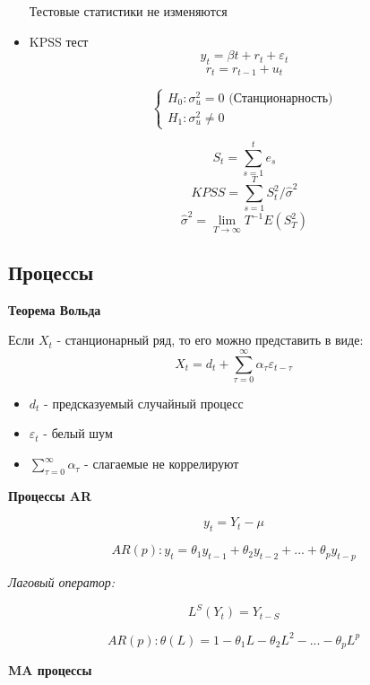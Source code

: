 \documentclass[a4paper, 12pt]{article}
\begin{document}
\begin{itemize}
    Тестовые статистики не изменяются
    
    \item KPSS тест
    \[y_{t} = \beta t + r_{t} + \varepsilon_{t}\]
    \[r_{t} = r_{t-1} + u_{t}\]
    
    \[\begin{cases}
        H_{0}: \sigma_{u}^{2} = 0 \textrm{ (Станционарность)} \\
        H_{1}: \sigma_{u}^{2} \neq 0
    \end{cases}\]
    
    \[S_{t} = \sum_{s = 1}^{t}e_{s}\]
    \[KPSS = \sum_{s = 1}^{T}S_{t}^{2} / \hat{\sigma}^{2}\]
    \[\hat{\sigma}^{2} =\lim_{T \to \infty} T^{-1}E(S^{2}_{T})\]
\end{itemize}

\subsection{Процессы}

\begin{center}
    \textbf{Теорема Вольда}
\end{center}

Если $X_{t}$ - станционарный ряд, то его можно представить в виде: \[X_{t} = d_{t} + \sum_{\tau = 0}^{\infty}\alpha_{\tau}\varepsilon_{t - \tau}\]

\begin{itemize}
    \item $d_{t}$ - предсказуемый случайный процесс
    \item $\varepsilon_{t}$ - белый шум
    \item $\sum_{\tau = 0}^{\infty}\alpha_{\tau}$ - слагаемые не коррелируют
\end{itemize}

\begin{center}
    \textbf{Процессы AR}
\end{center}

\[y_{t} = Y_{t} - \mu\]

\[AR(p): y_{t} = \theta_{1}y_{t-1} + \theta_{2}y_{t - 2} + ... + \theta_{p}y_{t - p}\]

\textit{Лаговый оператор:}

\[L^{S}(Y_{t}) = Y_{t - S}\]

\[AR(p): \theta(L) = 1 - \theta_{1}L - \theta_{2}L^{2} - ... - \theta_{p}L^{p}\]

\begin{center}
    \textbf{MA процессы}
\end{center}
\end{document}
